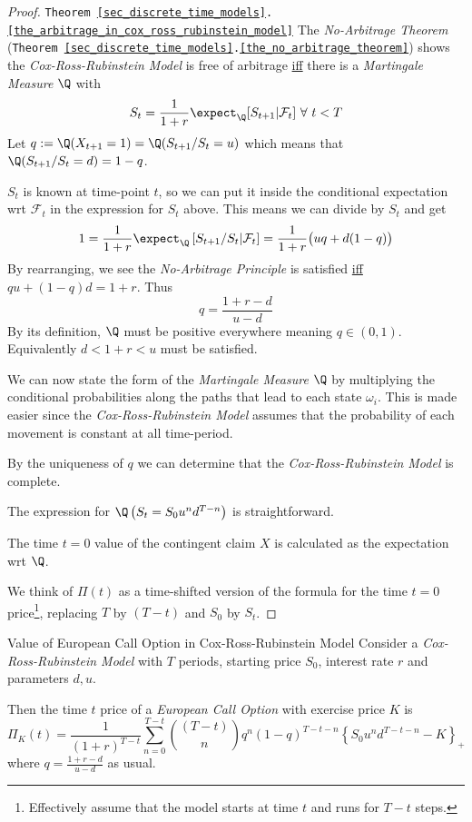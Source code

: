\documentclass[11pt,a4paper]{article}
\begin{document}
  \begin{proof}{\texttt{Theorem \ref{sec_discrete_time_models}.\ref{the_arbitrage_in_cox_ross_rubinstein_model}}}
    The \textit{No-Arbitrage Theorem} (\texttt{Theorem \ref{sec_discrete_time_models}.\ref{the_no_arbitrage_theorem}}) shows the \textit{Cox-Ross-Rubinstein Model} is free of arbitrage \underline{iff} there is a \textit{Martingale Measure} $\Q$ with
    \[ S_t=\frac1{1+r}\expect_\Q[S_{t+1}|\mathcal{F}_t]\ \forall\ t<T \]
    Let $q:=\Q(X_{t+1}=1)=\Q(S_{t+1}/S_t=u)$ which means that $\Q(S_{t+1}/S_t=d)=1-q$.
    \par $S_t$ is known at time-point $t$, so we can put it inside the conditional expectation wrt $\mathcal{F}_t$ in the expression for $S_t$ above. This means we can divide by $S_t$ and get
    \[ 1=\frac1{1+r}\expect_\Q\left[S_{t+1}/S_t|\mathcal{F}_t\right]=\frac1{1+r}\big(uq+d(1-q)\big) \]
    By rearranging, we see the \textit{No-Arbitrage Principle} is satisfied \underline{iff} $qu+(1-q)d=1+r$. Thus
    \[ q=\frac{1+r-d}{u-d} \]
    By its definition, $\Q$ must be positive everywhere meaning $q\in(0,1)$. Equivalently $d<1+r<u$ must be satisfied.
    \par We can now state the form of the \textit{Martingale Measure} $\Q$ by multiplying the conditional probabilities along the paths that lead to each state $\omega_i$. This is made easier since the \textit{Cox-Ross-Rubinstein Model} assumes that the probability of each movement is constant at all time-period.
    \par By the uniqueness of $q$ we can determine that the \textit{Cox-Ross-Rubinstein Model} is complete.
    \par The expression for $\Q\left(S_t=S_0u^nd^{T-n}\right)$ is straightforward.
    \par The time $t=0$ value of the contingent claim $X$ is calculated as the expectation wrt $\Q$.
    \par We think of $\Pi(t)$ as a time-shifted version of the formula for the time $t=0$ price\footnote{Effectively assume that the model starts at time $t$ and runs for $T-t$ steps.}, replacing $T$ by $(T-t)$ and $S_0$ by $S_t$.\proved
  \end{proof}

  \begin{proposition}{Value of European Call Option in Cox-Ross-Rubinstein Model}\label{prop_european_call_crr_model}
    Consider a \textit{Cox-Ross-Rubinstein Model} with $T$ periods, starting price $S_0$, interest rate $r$ and parameters $d,u$.
    \par Then the time $t$ price of a \textit{European Call Option} with exercise price $K$ is
    \[ \Pi_K(t)=\frac1{(1+r)^{T-t}}\sum_{n=0}^{T-t}{{(T-t)}\choose n}q^n(1-q)^{T-t-n}\left\{S_0u^nd^{T-t-n}-K\right\}_+ \]
    where $q=\frac{1+r-d}{u-d}$ as usual.
  \end{proposition}
\end{document}
